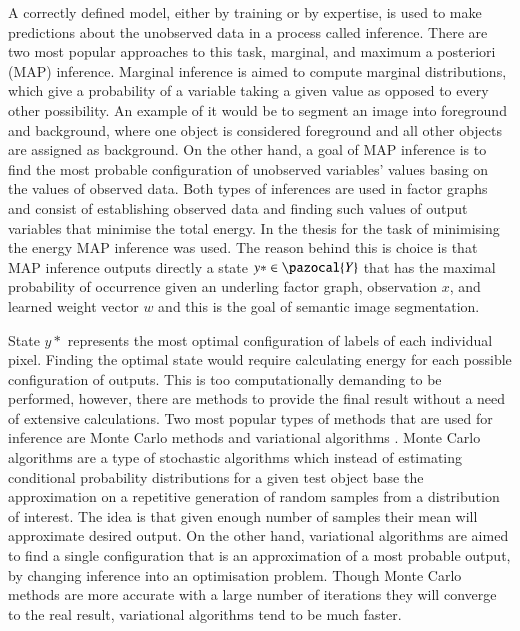 A correctly defined model, either by training or by expertise, is used to make predictions about the unobserved data in a process called inference. There are two most popular approaches to this task, marginal, and maximum a posteriori (MAP) inference. Marginal inference is aimed to compute marginal distributions, which give a probability of a variable taking a given value as opposed to every other possibility. An example of it would be to segment an image into foreground and background, where one object is considered foreground and all other objects are assigned as background. On the other hand, a goal of MAP inference is to find the most probable configuration of unobserved variables’ values basing on the values of observed data. Both types of inferences are used in factor graphs and consist of establishing observed data and finding such values of output variables that minimise the total energy. In the thesis for the task of minimising the energy MAP inference was used. The reason behind this is choice is that MAP inference outputs directly a state $y* \in \pazocal{Y}$ that has the maximal probability of occurrence given an underling factor graph, observation $x$, and learned weight vector $w$ and this is the goal of semantic image segmentation. 

State $y*$ represents the most optimal configuration of labels of each individual pixel. Finding the optimal state would require calculating energy for each possible configuration of outputs. This is too computationally demanding to be performed, however, there are methods to provide the final result without a need of extensive calculations. Two most popular types of methods that are used for inference are Monte Carlo methods and variational algorithms \cite{crf_sutton}. Monte Carlo algorithms are a type of stochastic algorithms which instead of estimating conditional probability distributions for a given test object base the approximation on a repetitive generation of random samples from a distribution of interest. The idea is that given enough number of samples their mean will approximate desired output. On the other hand, variational algorithms are aimed to find a single configuration that is an approximation of a most probable output, by changing inference into an optimisation problem. Though Monte Carlo methods are more accurate with a large number of iterations they will converge to the real result, variational algorithms tend to be much faster. 

